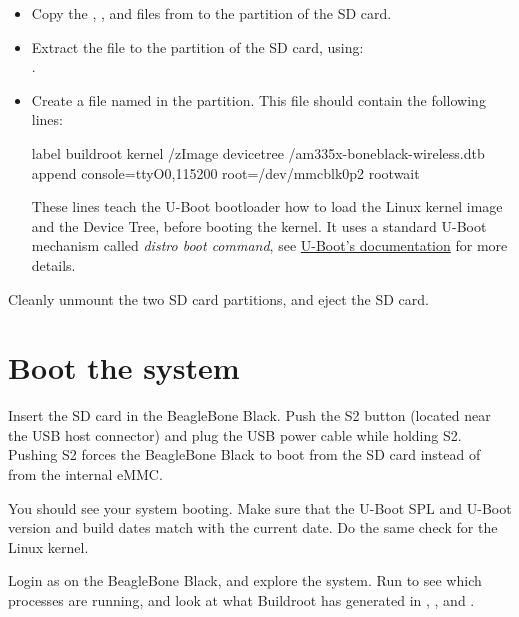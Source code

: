 \begin{itemize}

\item Copy the , ,  and
   files from
   to the  partition of the SD card.

\item Extract the  file to the 
  partition of the SD card, using:\\
  .

\item Create a file named  in the
   partition. This file should contain the following lines:

{\small
\begin{fileinput}
label buildroot
  kernel /zImage
  devicetree /am335x-boneblack-wireless.dtb
  append console=ttyO0,115200 root=/dev/mmcblk0p2 rootwait
\end{fileinput}
}

These lines teach the U-Boot bootloader how to load the Linux kernel
image and the Device Tree, before booting the kernel. It uses a
standard U-Boot mechanism called {\em distro boot command}, see
\href{https://docs.u-boot.org/en/stable/develop/distro.html}{U-Boot's documentation}
for more details.

\end{itemize}

Cleanly unmount the two SD card partitions, and eject the SD card.

\section{Boot the system}

Insert the SD card in the BeagleBone Black. Push the S2 button
(located near the USB host connector) and plug the USB power cable
while holding S2. Pushing S2 forces the BeagleBone Black to boot from
the SD card instead of from the internal eMMC.

You should see your system booting. Make sure that the U-Boot SPL and
U-Boot version and build dates match with the current date. Do the
same check for the Linux kernel.

Login as  on the BeagleBone Black, and explore the
system. Run  to see which processes are running, and look at
what Buildroot has generated in , , 
and .

